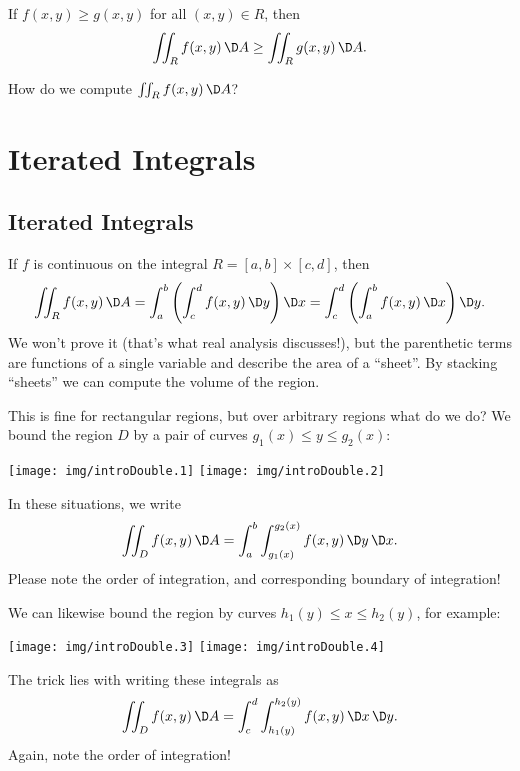 If $f(x,y)\geq g(x,y)$ for all $(x,y)\in R$, then
\begin{equation}
\iint_{R}f(x,y)\,\D A\geq\iint_{R}g(x,y)\,\D A.
\end{equation}

 How do we compute $\iint_{R}f(x,y)\,\D A$?

\ifblog\section{Iterated Integrals}\fi\iftex\subsection{Iterated Integrals}\fi

 If $f$ is continuous on the integral
$R=[a,b]\times[c,d]$, then
\begin{equation}
\iint_{R}f(x,y)\,\D A=\int^{b}_{a}\left(\int^{d}_{c}f(x,y)\,\D
y\right)\D x
=\int^{d}_{c}\left(\int^{b}_{a}f(x,y)\,\D x\right)\D y.
\end{equation}
We won't prove it (that's what real analysis discusses!), but the
parenthetic terms are functions of a single variable and describe
the area of a ``sheet''. By stacking ``sheets'' we can compute
the volume of the region. 

\M This is fine for rectangular regions, but over arbitrary
regions what do we do? We bound the region $D$ by a pair of
curves $g_{1}(x)\leq y\leq g_{2}(x)$:
\begin{center}
\texttt{[image: img/introDouble.1]}\qquad
\texttt{[image: img/introDouble.2]}
\end{center}
In these situations, we write
\begin{equation}
\iint_{D}f(x,y)\,\D
A=\int^{b}_{a}\int^{g_{2}(x)}_{g_{1}(x)}f(x,y)\,\D y\,\D x.
\end{equation}
Please note the order of integration, and corresponding boundary
of integration!

\M
We can likewise bound the region by curves $h_{1}(y)\leq x\leq
h_{2}(y)$, for example:
\begin{center}
\texttt{[image: img/introDouble.3]}\quad
\texttt{[image: img/introDouble.4]}
\end{center}
The trick lies with writing these integrals as
\begin{equation}
\iint_{D}f(x,y)\,\D
A=\int^{d}_{c}\int^{h_{2}(y)}_{h_{1}(y)}f(x,y)\,\D x\,\D y.
\end{equation}
Again, note the order of integration!

